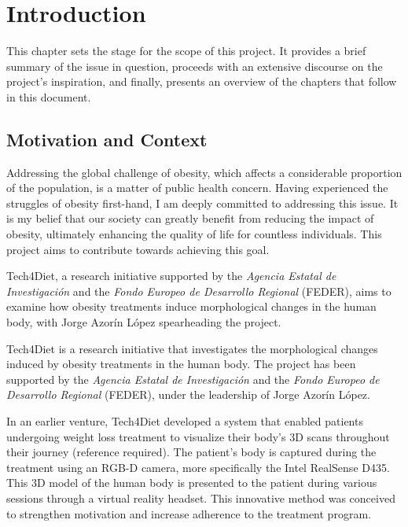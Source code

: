 \chapter{Introduction}\label{chap:introduction}

This chapter sets the stage for the scope of this project. It provides a brief
summary of the issue in question, proceeds with an extensive discourse on the
project's inspiration, and finally, presents an overview of the chapters that
follow in this document.

\section{Motivation and Context}

Addressing the global challenge of obesity, which affects a considerable
proportion of the population, is a matter of public health concern. Having
experienced the struggles of obesity first-hand, I am deeply committed to
addressing this issue. It is my belief that our society can greatly benefit
from reducing the impact of obesity, ultimately enhancing the quality of life
for countless individuals. This project aims to contribute towards achieving
this goal.

Tech4Diet, a research initiative supported by the \textit{Agencia Estatal de
	Investigación} and the \textit{Fondo Europeo de Desarrollo Regional} (FEDER),
aims to examine how obesity treatments induce morphological changes in the
human body, with Jorge Azorín López spearheading the project.

Tech4Diet is a research initiative that investigates the morphological changes
induced by obesity treatments in the human body. The project has been supported
by the \textit{Agencia Estatal de Investigación} and the \textit{Fondo Europeo
	de Desarrollo Regional} (FEDER), under the leadership of Jorge Azorín López.

In an earlier venture, Tech4Diet developed a system that enabled patients
undergoing weight loss treatment to visualize their body's 3D scans throughout
their journey (reference required). The patient's body is captured during the
treatment using an RGB-D camera, more specifically the Intel RealSense D435.
This 3D model of the human body is presented to the patient during various
sessions through a virtual reality headset. This innovative method was
conceived to strengthen motivation and increase adherence to the treatment
program.

